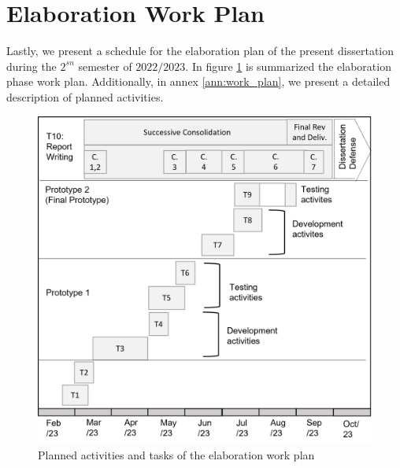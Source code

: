\section{Elaboration Work Plan}
\label{sec:work-plan}

Lastly, we present a schedule for the elaboration plan of the present dissertation during the $2^{sn}$ semester of $2022/2023$. In figure \ref{fig:tasks_calendar} is summarized the elaboration phase work plan. Additionally, in annex \ref{ann:work_plan}, we present a detailed description of planned activities.

\begin{figure}[h]
    \centering
    \includegraphics[scale=0.5]{Chapters/Figures/tasks_calendar.png}
    \caption{Planned activities and tasks of the elaboration work plan}
    \label{fig:tasks_calendar}
\end{figure}